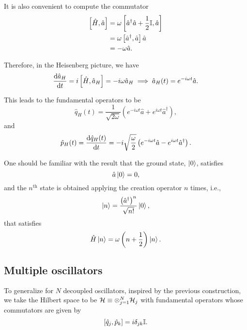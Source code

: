 It is also convenient to compute the commutator
\begin{subequations}
    \begin{align}
        \relax\left[\hat{H},\hat{a}\right]&=\omega\left[\hat{a}^{\dagger}\hat{a}+\frac{1}{2}{\mathbb{I}},\hat{a}\right]\\
        &=\omega\left[\hat{a}^{\dagger},\hat{a}\right]\hat{a}\\
        &=-\omega\hat{a}.
    \end{align}
\end{subequations}

Therefore, in the Heisenberg picture, we have
\begin{equation}
    \diff{\hat{a}_H}{t}=i\left[\hat{H},\hat{a}_H\right]=-i\omega\hat{a}_H\implies \hat{a}_H(t)=e^{-i\omega t}\hat{a}.
\end{equation}

This leads to the fundamental operators to be
\begin{equation}
    \hat{q}_H(t)=\frac{1}{\sqrt{2\omega}}\left(e^{-i\omega t}\hat{a}+e^{i\omega t}\hat{a}^{\dagger}\right),
\end{equation}
and
\begin{equation}
    \hat{p}_H(t)=\diff{\hat{q}_H(t)}{t}=-i\sqrt{\frac{\omega}{2}}\left(e^{-i\omega t}\hat{a}-e^{i\omega t}\hat{a}^{\dagger}\right).
\end{equation}

One should be familiar with the result that the ground state, \(\ket{0}\), satisfies
\begin{equation}
    \hat{a}\ket{0}=0,
\end{equation}
and the \(n^{\mathrm{th}}\) state is obtained applying the creation operator \(n\) times, i.e.,
\begin{equation}
    \ket{n}=\frac{\left(\hat{a}^{\dagger}\right)^{n}}{\sqrt{n!}}\ket{0},
\end{equation}
that satisfies
\begin{equation}
    \hat{H}\ket{n}=\omega\left(n+\frac{1}{2}\right)\ket{n}.
\end{equation}

\subsection*{Multiple oscillators}

To generalize for \(N\) decoupled oscillators, inspired by the previous construction, we take the Hilbert space to be \({\mathcal{H}}\equiv\otimes_{j=1}^N{\mathcal{H}}_j\) with fundamental operators whose commutators are given by
\begin{equation}
    \relax[\hat{q}_j,\hat{p}_k]=i\delta_{jk}{\mathbb{I}}.
\end{equation}

